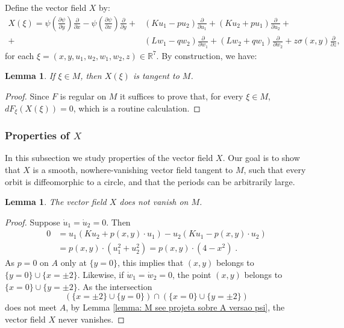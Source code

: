 \documentclass[11pt,reqno]{amsart}
\theoremstyle{plain}
\newtheorem{lemma}[theorem]{Lemma}
\theoremstyle{definition}
\theoremstyle{remark}
\theoremstyle{plain}
\numberwithin{equation}{section}
\newcommand{\R}{\mathbb{R}}
\begin{document}
							
							Define the vector field $X$ by: \begin{align*}X(\xi)=\psi \left(\frac{\partial\psi}{\partial y}\right)\frac{\partial}{\partial x}-\psi \left(\frac{\partial\psi}{\partial x}\right)\frac{\partial}{\partial y}+&(Ku_{1}-pu_{2})\frac{\partial}{\partial u_{1}}+(Ku_{2}+pu_{1})\frac{\partial}{\partial u_{2}}+\\+&(Lw_{1}-qw_{2})\frac{\partial}{\partial w_{1}}+(Lw_{2}+qw_{1})\frac{\partial}{\partial w_{2}}+z\sigma(x,y)\frac{\partial}{\partial z},\end{align*} for each $\xi=(x,y,u_{1},u_{2},w_{1},w_{2},z)\in \R^{7}$. By construction, we have: 
							
							\begin{lemma} \label{lemma: X e tangent a M} 
								If $\xi \in M$, then $X(\xi)$ is tangent to $M$.
							\end{lemma}
							\begin{proof}
							Since $F$ is regular on $M$ it suffices to prove that, for every $\xi \in M$, $dF_{\xi}(X(\xi))=0$, which is a routine calculation.
							\end{proof}
						
							
							\subsubsection{Properties of $X$}
							
							In this subsection we study properties of the vector field \(X\). Our goal is to show that \(X\) is a smooth, nowhere-vanishing vector field tangent to \(M\), such that every orbit is diffeomorphic to a circle, and that the periods can be arbitrarily large.
							
							
							
							
							\begin{lemma} \label{lemma: X nunca e zero em M}
								The vector field $X$ does not vanish on $M$.
							\end{lemma}
							\begin{proof}  
								Suppose $\dot{u}_{1}=\dot{u}_{2}=0$. Then  
								\begin{align*}
									0&=u_{1}(Ku_{2}+p(x,y)\cdot u_{1})-u_{2}(Ku_{1}-p(x,y)\cdot u_{2})
									\\&=p(x,y)\cdot (u_{1}^{2}+u_{2}^{2}) = p(x,y)\cdot (4-x^2)\; .
								\end{align*}
								As $p=0$ on $A$ only at $\{y=0\}$, this implies that $(x,y)$ belongs to $\{y=0\}\cup \{ x= \pm2\}$.  Likewise, if $\dot{w}_{1}=\dot{w}_{2}=0$, the point $(x,y)$ belongs to $\{x=0\}\cup \{ y= \pm2\}$.  As the intersection
								\[ ( \{ x= \pm2\}\cup \{y=0\})\cap (\{x=0\}\cup \{ y= \pm2\})\]
								does not meet $A$, by Lemma  \ref{lemma: M see projeta sobre A versao psi}, the vector field $X$ never vanishes.
							\end{proof}
							
\end{document}

